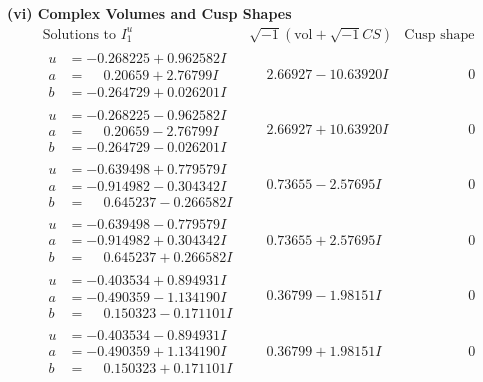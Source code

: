 \documentclass[1p]{elsarticle_modified}
\theoremstyle{definition}
\newcommand{\I}{\sqrt{-1}}
\begin{document}
\newpage\flushleft \textbf{(vi) Complex Volumes and Cusp Shapes}
$$\begin{array}{c|c|c}  
\text{Solutions to }I^u_{1}& \I (\text{vol} + \sqrt{-1}CS) & \text{Cusp shape}\\
 \hline 
\begin{aligned}
u &= -0.268225 + 0.962582 I \\
a &= \phantom{-}0.20659 + 2.76799 I \\
b &= -0.264729 + 0.026201 I\end{aligned}
 & \phantom{-}2.66927 - 10.63920 I & \phantom{-0.000000 } 0 \\ \hline\begin{aligned}
u &= -0.268225 - 0.962582 I \\
a &= \phantom{-}0.20659 - 2.76799 I \\
b &= -0.264729 - 0.026201 I\end{aligned}
 & \phantom{-}2.66927 + 10.63920 I & \phantom{-0.000000 } 0 \\ \hline\begin{aligned}
u &= -0.639498 + 0.779579 I \\
a &= -0.914982 - 0.304342 I \\
b &= \phantom{-}0.645237 - 0.266582 I\end{aligned}
 & \phantom{-}0.73655 - 2.57695 I & \phantom{-0.000000 } 0 \\ \hline\begin{aligned}
u &= -0.639498 - 0.779579 I \\
a &= -0.914982 + 0.304342 I \\
b &= \phantom{-}0.645237 + 0.266582 I\end{aligned}
 & \phantom{-}0.73655 + 2.57695 I & \phantom{-0.000000 } 0 \\ \hline\begin{aligned}
u &= -0.403534 + 0.894931 I \\
a &= -0.490359 - 1.134190 I \\
b &= \phantom{-}0.150323 - 0.171101 I\end{aligned}
 & \phantom{-}0.36799 - 1.98151 I & \phantom{-0.000000 } 0 \\ \hline\begin{aligned}
u &= -0.403534 - 0.894931 I \\
a &= -0.490359 + 1.134190 I \\
b &= \phantom{-}0.150323 + 0.171101 I\end{aligned}
 & \phantom{-}0.36799 + 1.98151 I & \phantom{-0.000000 } 0 \\ \hline\begin{aligned}

\end{aligned}
\end{array}$$
\end{document}
